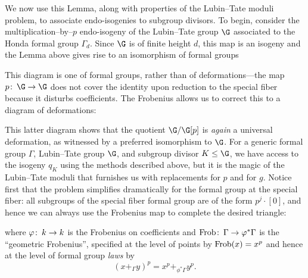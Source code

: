 We now use this Lemma, along with properties of the Lubin--Tate moduli problem, to associate endo-isogenies to subgroup divisors.  To begin, consider the multiplication--by--\(p\) endo-isogeny of the Lubin--Tate group \(\G\) associated to the Honda formal group \(\Gamma_d\).  Since \(\G\) is of finite height \(d\), this map is an isogeny and the Lemma above gives rise to an isomorphism of formal groups
\begin{center}
\end{center}
This diagram is one of formal groups, rather than of deformations---the map \(p\co \G \to \G\) does not cover the identity upon reduction to the special fiber because it disturbs coefficients.  The Frobenius allows us to correct this to a diagram of deformations:
\begin{center}
\end{center}
This latter diagram shows that the quotient \(\G / \G[p]\) is \emph{again} a universal deformation, as witnessed by a preferred isomorphism to \(\G\).  For a generic formal group \(\Gamma\), Lubin--Tate group \(\G\), and subgroup divisor \(K \le \G\), we have access to the isogeny \(q_K\) using the methods described above, but it is the magic of the Lubin--Tate moduli that furnishes us with replacements for \(p\) and for \(g\).  Notice first that the problem simplifies dramatically for the formal group at the special fiber: all subgroups of the special fiber formal group are of the form \(p^j \cdot [0]\), and hence we can always use the Frobenius map to complete the desired triangle:
\begin{center}
\end{center}
where \(\varphi\colon\thinspace k \to k\) is the Frobenius on coefficients and \(\operatorname{Frob}\colon\thinspace \Gamma \to \varphi^* \Gamma\) is the ``geometric Frobenius'', specified at the level of points by \(\operatorname{Frob}(x) = x^p\) and hence at the level of formal group \emph{laws} by \[(x +_\Gamma y)^p = x^p +_{\phi^* \Gamma} y^p.\]

